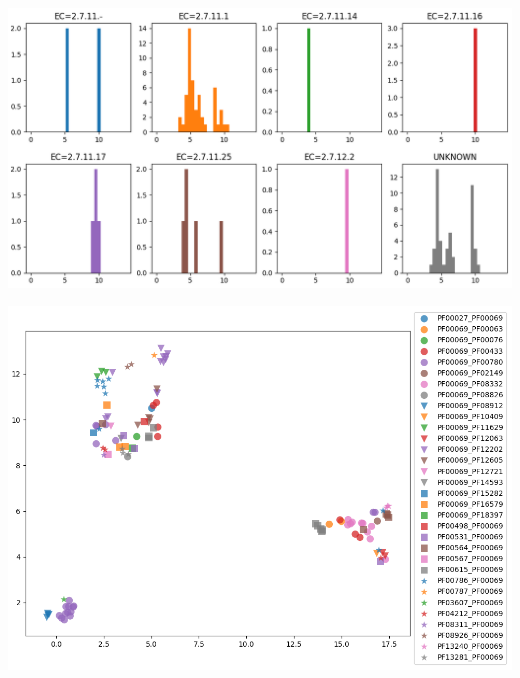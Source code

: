 \documentclass{beamer}
\begin{document}
  \begin{frame}[plain]
    \begin{center}
      \includegraphics[width=\textwidth]{img/iso_density_ec.png}
    \end{center}
  \end{frame}

  \begin{frame}[plain]
    \begin{center}
      \includegraphics[width=\textwidth]{img/linker_umap_arch.png}
    \end{center}
  \end{frame}
\end{document}
